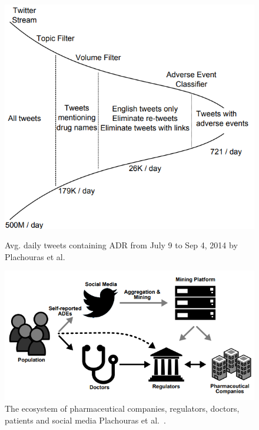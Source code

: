 \begin{figure}[h]
	\centering
	\begin{minipage}{0.45\textwidth}
		\includegraphics[width=0.99\linewidth]{Figures/g.png}
		\caption{Avg. daily tweets containing ADR from July 9 to Sep 4, 2014 by Plachouras et al.~\cite{plachouras2016quantifying}}
		\label{fig:daily-tweets-adr}
	\end{minipage}
	\hfill
	\begin{minipage}{0.45\textwidth}
		\includegraphics[width=0.99\linewidth]{Figures/j.png}
		\caption{The ecosystem of pharmaceutical companies, regulators, doctors, patients and social media Plachouras et al.~\cite{plachouras2016quantifying}.}
		\label{fig:ecosystem-pharmaceutical}
	\end{minipage}
\end{figure}

